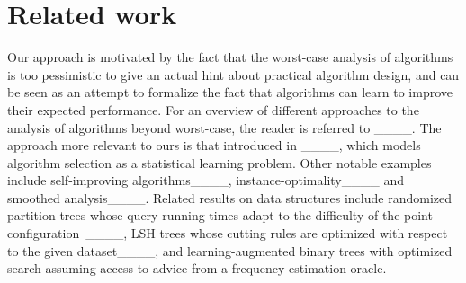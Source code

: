 \section{Related work}
Our approach is motivated by the fact that the worst-case analysis of algorithms is too pessimistic to give an actual hint about practical algorithm design, and   
can be seen as an attempt to formalize the fact that algorithms can learn to improve their expected performance. For an overview of different approaches to the analysis of algorithms beyond worst-case, the reader is referred to ____. The approach more relevant to ours is that introduced in ____, which models algorithm selection as a statistical learning problem. Other notable examples include 
self-improving algorithms____, instance-optimality____ and smoothed analysis____. Related results on data structures include randomized partition trees whose query running times adapt to the difficulty of the point configuration~____, LSH trees whose cutting rules are optimized with respect to the given dataset____, and learning-augmented binary trees with optimized search assuming access to advice from a frequency estimation oracle.